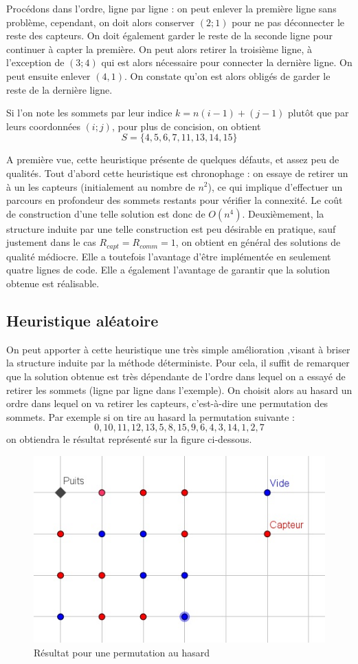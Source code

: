 \documentclass[12pt,a4paper]{article}
\begin{document}
Procédons dans l'ordre, ligne par ligne :  on peut enlever la première ligne sans problème, cependant, on doit alors conserver $(2;1)$ pour ne pas déconnecter le reste des capteurs. On doit également garder le reste de la seconde ligne pour continuer à capter la première. On peut alors retirer la troisième ligne, à l'exception de $(3;4)$ qui est alors nécessaire pour connecter la dernière ligne. On peut ensuite enlever $(4,1)$. On constate qu'on est alors obligés de garder le reste de la dernière ligne.

Si l'on note les sommets par leur indice $k=n(i-1)+(j-1)$ plutôt que par leurs coordonnées $(i;j)$, pour plus de concision, on obtient
\[S=\{4,5,6,7,11,13,14,15\}\]

A première vue, cette heuristique présente de quelques défauts, et assez peu de qualités. Tout d'abord cette heuristique est chronophage : on essaye de retirer un à un les capteurs (initialement au nombre de $n^2$), ce qui implique d'effectuer un parcours en profondeur des sommets restants pour vérifier la connexité. Le coût de construction d'une telle solution est donc de $O(n^4)$. Deuxièmement, la structure induite par une telle construction est peu désirable en pratique, sauf justement dans le cas $R_{capt}=R_{comm}=1$, on obtient en général des solutions de qualité médiocre. Elle a toutefois l'avantage d'être implémentée en seulement quatre lignes de code. Elle a également l'avantage de garantir que la solution obtenue est réalisable. 
\subsection{Heuristique aléatoire} 
On peut apporter à cette heuristique une très simple amélioration ,visant à briser la structure induite par la méthode déterministe. Pour cela, il suffit de remarquer que la solution obtenue est très dépendante de l'ordre dans lequel on a essayé de retirer les sommets (ligne par ligne dans l'exemple). On choisit alors au hasard un ordre dans lequel on va retirer les capteurs, c'est-à-dire une permutation des sommets. Par exemple si on tire au hasard la permutation suivante : \[0,10,11,12,13,5,8,15,9,6,4,3,14,1,2,7\] on obtiendra le résultat représenté sur la figure ci-dessous.
\begin{figure}[h]
\center
\includegraphics[scale=1]{Images/4_1_1_random.jpg}
\caption{Résultat pour une permutation au hasard}
\end{figure}
\end{document}
